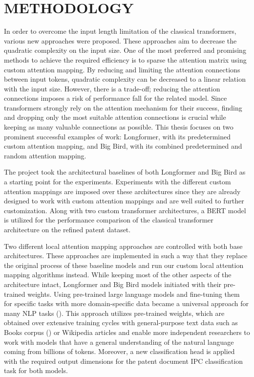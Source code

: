 \documentclass{iyte}
\begin{document}
\chapter{METHODOLOGY}

In order to overcome the input length limitation of the classical transformers, various new approaches were proposed. These approaches aim to decrease the quadratic complexity on the input size. One of the most preferred and promising methods to achieve the required efficiency is to sparse the attention matrix using custom attention mapping. By reducing and limiting the attention connections between input tokens, quadratic complexity can be decreased to a linear relation with the input size. However, there is a trade-off; reducing the attention connections imposes a risk of performance fall for the related model. Since transformers strongly rely on the attention mechanism for their success, finding and dropping only the most suitable attention connections is crucial while keeping as many valuable connections as possible. This thesis focuses on two prominent successful examples of work: Longformer, with its predetermined custom attention mapping, and Big Bird, with its combined predetermined and random attention mapping.

The project took the architectural baselines of both Longformer and Big Bird as a starting point for the experiments. Experiments with the different custom attention mappings are imposed over these architectures since they are already designed to work with custom attention mappings and are well suited to further customization. Along with two custom transformer architectures, a BERT model is utilized for the performance comparison of the classical transformer architecture on the refined patent dataset.

Two different local attention mapping approaches are controlled with both base architectures. These approaches are implemented in such a way that they replace the original process of these baseline models and run our custom local attention mapping algorithms instead. While keeping most of the other aspects of the architecture intact, Longformer and Big Bird models initiated with their pre-trained weights. Using pre-trained large language models and fine-tuning them for specific tasks with more domain-specific data became a universal approach for many NLP tasks (\citealt{pre_trained_models}). This approach utilizes pre-trained weights, which are obtained over extensive training cycles with general-purpose text data such as Books corpus (\citealt{books_data}) or Wikipedia articles and enable more independent researchers to work with models that have a general understanding of the natural language coming from billions of tokens. Moreover, a new classification head is applied with the required output dimensions for the patent document IPC classification task for both models.
\end{document}
